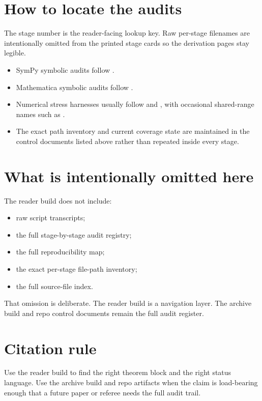 \section{How to locate the audits}

The stage number is the reader-facing lookup key.  Raw per-stage filenames are
intentionally omitted from the printed stage cards so the derivation pages stay
legible.

\begin{itemize}[leftmargin=2.2em]
  \item SymPy symbolic audits follow
  .
  \item Mathematica symbolic audits follow
  .
  \item Numerical stress harnesses usually follow
   and , with
  occasional shared-range names such as .
  \item The exact path inventory and current coverage state are maintained in
  the control documents listed above rather than repeated inside every stage.
\end{itemize}

\section{What is intentionally omitted here}

The reader build does not include:
\begin{itemize}[leftmargin=2.2em]
  \item raw script transcripts;
  \item the full stage-by-stage audit registry;
  \item the full reproducibility map;
  \item the exact per-stage file-path inventory;
  \item the full source-file index.
\end{itemize}

That omission is deliberate. The reader build is a navigation layer.  The
archive build and repo control documents remain the full audit register.

\section{Citation rule}

Use the reader build to find the right theorem block and the right status
language. Use the archive build and repo artifacts when the claim is
load-bearing enough that a future paper or referee needs the full audit trail.
